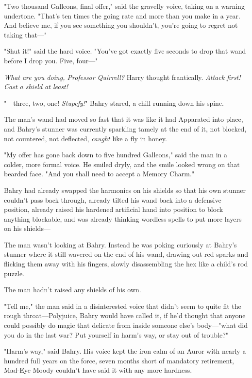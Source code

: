 "Two thousand Galleons, final offer," said the gravelly voice, taking on a
warning undertone. "That's ten times the going rate and more than you make in a
year. And believe me, if you see something you shouldn't, you're going to
regret not taking that---"

"Shut it!" said the hard voice. "You've got exactly five seconds to drop that
wand before I drop you. Five, four---"

\emph{What are you doing, Professor Quirrell?} Harry thought frantically.
\emph{Attack first! Cast a shield at least!}

"---three, two, one! \emph{Stupefy!}"
\later
Bahry stared, a chill running down his spine.

The man's wand had moved so fast that it was like it had Apparated into place,
and Bahry's stunner was currently sparkling tamely at the end of it, not
blocked, not countered, not deflected, \emph{caught} like a fly in honey.

"My offer has gone back down to five hundred Galleons," said the man in a
colder, more formal voice. He smiled dryly, and the smile looked wrong on that
bearded face. "And you shall need to accept a Memory Charm."

Bahry had already swapped the harmonics on his shields so that his own stunner
couldn't pass back through, already tilted his wand back into a defensive
position, already raised his hardened artificial hand into position to block
anything blockable, and was already thinking wordless spells to put more layers
on his shields---

The man wasn't looking at Bahry. Instead he was poking curiously at Bahry's
stunner where it still wavered on the end of his wand, drawing out red sparks
and flicking them away with his fingers, slowly disassembling the hex like a
child's rod puzzle.

The man hadn't raised any shields of his own.

"Tell me," the man said in a disinterested voice that didn't seem to quite fit
the rough throat---Polyjuice, Bahry would have called it, if he'd thought that
anyone could possibly do magic that delicate from inside someone else's
body---"what did you do in the last war? Put yourself in harm's way, or stay
out of trouble?"

"Harm's way," said Bahry. His voice kept the iron calm of an Auror with nearly
a hundred full years on the force, seven months short of mandatory retirement,
Mad-Eye Moody couldn't have said it with any more hardness.

